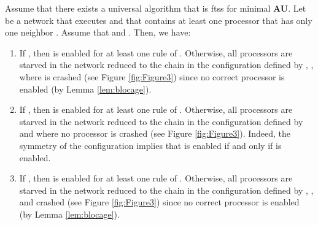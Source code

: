 \documentclass[11pt,english,letterpaper]{article}
\newenvironment{proof}{{\noindent\bf Proof. } }{{\hfill }}
\begin{document}
\begin{proof}
Assume that there exists a universal algorithm  that is ftss for minimal \textbf{AU}. Let  be a network that executes  and that contains at least one processor  that has only one neighbor . Assume that  and . Then, we have:

\begin{enumerate}
\item If , then  is enabled for at least one rule of . Otherwise, all processors are starved in the network reduced to the chain  in the configuration  defined by , ,  where  is crashed (see Figure \ref{fig:Figure3}) since no correct processor is enabled (by Lemma \ref{lem:blocage}).
\item If , then  is enabled for at least one rule of . Otherwise, all processors are starved in the network reduced to the	chain  in the configuration  defined by  and where no processor is crashed (see Figure \ref{fig:Figure3}). Indeed, the symmetry of the configuration implies that  is enabled if and only if  is enabled.
\item If , then  is enabled for at least one rule of . Otherwise, all processors are starved in the network reduced to the	chain  in the configuration  defined by , ,  and  crashed (see Figure \ref{fig:Figure3}) since no correct processor is enabled (by Lemma \ref{lem:blocage}).
\end{enumerate}


\end{proof}
\end{document}

